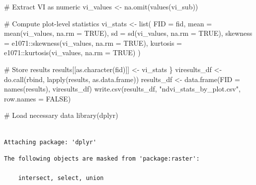 \documentclass[
  letterpaper,
  DIV=11,
  numbers=noendperiod]{scrartcl}
\newenvironment{Shaded}{\begin{snugshade}}{\end{snugshade}}
\newcommand{\AttributeTok}[1]{\textcolor[rgb]{0.40,0.45,0.13}{#1}}
\newcommand{\CommentTok}[1]{\textcolor[rgb]{0.37,0.37,0.37}{#1}}
\newcommand{\ConstantTok}[1]{\textcolor[rgb]{0.56,0.35,0.01}{#1}}
\newcommand{\FunctionTok}[1]{\textcolor[rgb]{0.28,0.35,0.67}{#1}}
\newcommand{\NormalTok}[1]{\textcolor[rgb]{0.00,0.23,0.31}{#1}}
\newcommand{\OtherTok}[1]{\textcolor[rgb]{0.00,0.23,0.31}{#1}}
\newcommand{\SpecialCharTok}[1]{\textcolor[rgb]{0.37,0.37,0.37}{#1}}
\newcommand{\StringTok}[1]{\textcolor[rgb]{0.13,0.47,0.30}{#1}}
\begin{document}
\begin{Shaded}
\begin{Highlighting}[]
  \CommentTok{\# Extract VI as numeric }
\NormalTok{  vi\_values }\OtherTok{\textless{}{-}} \FunctionTok{na.omit}\NormalTok{(}\FunctionTok{values}\NormalTok{(vi\_sub))}
  
  \CommentTok{\# Compute plot{-}level statistics}
\NormalTok{  vi\_stats }\OtherTok{\textless{}{-}} \FunctionTok{list}\NormalTok{(}
    \AttributeTok{FID =}\NormalTok{ fid,}
    \AttributeTok{mean =} \FunctionTok{mean}\NormalTok{(vi\_values, }\AttributeTok{na.rm =} \ConstantTok{TRUE}\NormalTok{),}
    \AttributeTok{sd =} \FunctionTok{sd}\NormalTok{(vi\_values, }\AttributeTok{na.rm =} \ConstantTok{TRUE}\NormalTok{),}
    \AttributeTok{skewness =}\NormalTok{ e1071}\SpecialCharTok{::}\FunctionTok{skewness}\NormalTok{(vi\_values, }\AttributeTok{na.rm =} \ConstantTok{TRUE}\NormalTok{),}
    \AttributeTok{kurtosis =}\NormalTok{ e1071}\SpecialCharTok{::}\FunctionTok{kurtosis}\NormalTok{(vi\_values, }\AttributeTok{na.rm =} \ConstantTok{TRUE}\NormalTok{)}
\NormalTok{  )}

  \CommentTok{\# Store results}
\NormalTok{  results[[}\FunctionTok{as.character}\NormalTok{(fid)]] }\OtherTok{\textless{}{-}}\NormalTok{ vi\_stats}
\NormalTok{\}}
\NormalTok{viresults\_df }\OtherTok{\textless{}{-}} \FunctionTok{do.call}\NormalTok{(rbind, }\FunctionTok{lapply}\NormalTok{(results, as.data.frame))}
\NormalTok{results\_df }\OtherTok{\textless{}{-}} \FunctionTok{data.frame}\NormalTok{(}\AttributeTok{FID =} \FunctionTok{names}\NormalTok{(results), viresults\_df)}
\FunctionTok{write.csv}\NormalTok{(results\_df, }\StringTok{"ndvi\_stats\_by\_plot.csv"}\NormalTok{, }\AttributeTok{row.names =} \ConstantTok{FALSE}\NormalTok{)}
\end{Highlighting}
\end{Shaded}

\begin{Shaded}
\begin{Highlighting}[]
\CommentTok{\# Load necessary data}
\FunctionTok{library}\NormalTok{(dplyr)}
\end{Highlighting}
\end{Shaded}

\begin{verbatim}

Attaching package: 'dplyr'
\end{verbatim}

\begin{verbatim}
The following objects are masked from 'package:raster':

    intersect, select, union
\end{verbatim}
\end{document}
